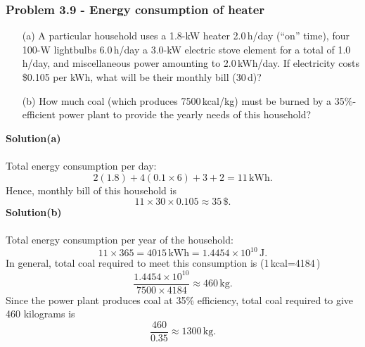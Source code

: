 \documentclass{article}
\begin{document}
\subsubsection*{Problem 3.9 - Energy consumption of heater}
\begin{enumerate}
    \item[(a)]A particular household uses a 1.8-kW heater 2.0\,h/day (“on” time), four 100-W lightbulbs 6.0\,h/day a 3.0-kW electric stove element for a total of 1.0\,h/day, and miscellaneous power amounting to 2.0\,kWh/day. If electricity costs \$0.105 per kWh, what will be their monthly bill (30\,d)?
    \item[(b)] How much coal (which produces 7500\,kcal/kg) must be burned by a 35\%-efficient power plant to provide the yearly needs of this household?
\end{enumerate}
\textbf{Solution(a)}
\\
\\Total energy consumption per day:
\[2(1.8)+4(0.1\times6)+3+2=11\,\text{kWh}.\]
Hence, monthly bill of this household is
\[11\times30\times0.105\approx35\,\text{\$}.\]
\textbf{Solution(b)}
\\
\\Total energy consumption per year of the household:
\[11\times365=4015\,\text{kWh}=1.4454\times10^{10}\,\text{J}.\]
In general, total coal required to meet this consumption is (1\,kcal=4184\,)
\[\frac{1.4454\times10^{10}}{7500\times4184}\approx460\,\text{kg}.\]
Since the power plant produces coal at 35\% efficiency, total coal required to give 460 kilograms is 
\[\frac{460}{0.35}\approx1300\,\text{kg}.\]
\end{document}
